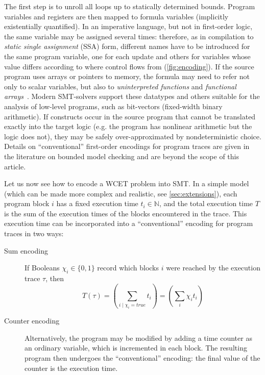 \documentclass[a4paper,twocolumn,11pt]{article}
\newcommand\true{\mathit{true}}
\newcommand{\NN}{\mathbb{N}}
\begin{document}
The first step is to unroll all loops up to statically determined bounds.
Program variables and registers are then mapped to formula variables (implicitly existentially quantified). In an imperative language, but not in first-order logic, the same variable may be assigned several times: therefore, as in compilation to \emph{static single assignment} (SSA) form, different names have to be introduced for the same program variable, one for each update and others for variables whose value differs according to where control flows from (\autoref{fig:encoding}).
If the source program uses arrays or pointers to memory, the formula may need to refer not only to scalar variables, but also to \emph{uninterpreted functions} and \emph{functional arrays}~\parencite{Kroening_Strichman}.
Modern SMT-solvers support these datatypes and others suitable for the analysis of low-level programs, such as bit-vectors (fixed-width binary arithmetic).
If constructs occur in the source program that cannot be translated exactly into the target logic (e.g. the program has nonlinear arithmetic but the logic does not), they may be safely over-approximated by nondeterministic choice.
Details on ``conventional'' first-order encodings for program traces are given in the literature on bounded model checking \parencite{DBLP:journals/tse/CordeiroFM12} and are beyond the scope of this article.

Let us now see how to encode a WCET problem into SMT.
In a simple model (which can be made more complex and realistic, see \autoref{sec:extensions}), each program block $i$ has a fixed execution time $t_i \in \NN$, and the total execution time $T$ is the sum of the execution times of the blocks encountered in the trace. This execution time can be incorporated into a ``conventional'' encoding for program traces in two ways:

\begin{description}
\item[Sum encoding] If Booleans $\chi_i \in \{0,1\}$ record which blocks $i$ were reached by the execution trace $\tau$, then
\begin{equation}\label{eqn:sum_encoding}
T(\tau) = \left ( \sum_{i \mid \chi_i=\true} t_i \right)
        = \left (\sum_i \chi_i t_i \right)
\end{equation}
\item[Counter encoding]
Alternatively, the program may be modified by adding a time counter as an ordinary variable, which is incremented in each block.
The resulting program then undergoes the ``conventional'' encoding: the final value of the counter is the execution time.
\end{description}
\end{document}
